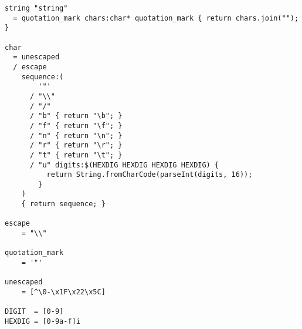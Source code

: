 \begin{lstlisting}[language=PEG, label={app:animools:grammar}, caption={Animools Language Grammar}]
string "string"
  = quotation_mark chars:char* quotation_mark { return chars.join(""); }

char
  = unescaped
  / escape
    sequence:(
        '"'
      / "\\"
      / "/"
      / "b" { return "\b"; }
      / "f" { return "\f"; }
      / "n" { return "\n"; }
      / "r" { return "\r"; }
      / "t" { return "\t"; }
      / "u" digits:$(HEXDIG HEXDIG HEXDIG HEXDIG) {
          return String.fromCharCode(parseInt(digits, 16));
        }
    )
    { return sequence; }

escape
    = "\\"

quotation_mark
    = '"'

unescaped
    = [^\0-\x1F\x22\x5C]

DIGIT  = [0-9]
HEXDIG = [0-9a-f]i
\end{lstlisting}